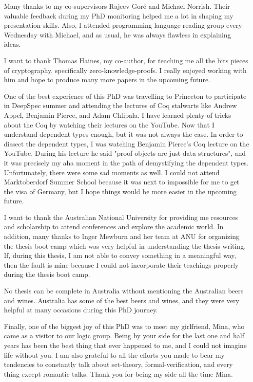 Many thanks to my co-supervisors Rajeev Gor\'e and Michael Norrish. Their valuable feedback during my PhD monitoring 
helped me a lot in shaping my presentation skills. Also, I attended programming language reading 
group every Wednesday with  Michael, and as usual, he was always flawless in explaining ideas. 
 
 I want to thank Thomas Haines, my co-author,  for teaching me all the bits pieces of cryptography, specifically zero-knowledge-proofs.  
 I really enjoyed working with him and hope to produce many more papers in the upcoming future. 
 
 
 One of the best experience of this PhD was travelling to Princeton to participate in DeepSpec summer and attending 
 the lectures of Coq stalwarts  like Andrew Appel, Benjamin Pierce, and Adam Chlipala. I have learned 
 plenty of tricks about the Coq by watching their lectures on the YouTube. Now that I understand 
 dependent types enough, but it was not always the case. In order to dissect the dependent types, 
 I was watching Benjamin Pierce's Coq lecture on the YouTube. During his lecture he said  "proof objects are 
 just data structures", and it was precisely my aha moment in the path of demystifying the dependent types. 
 Unfortunately, there were some sad moments as well. I could not attend Marktoberdorf Summer School because 
 it was next to impossible for me to get the visa of Germany, but I hope
 things would be more easier in the upcoming future. 
 
 I want to thank the Australian National University for providing me resources and scholarship to attend 
 conferences and explore the academic world. In addition, many thanks to 
 Inger Mewburn  and her team at ANU for organizing the thesis boot camp which was very helpful 
 in understanding the thesis writing. If, during this thesis, I am not able to convey something in 
 a meaningful way, then the fault is mine because I could not incorporate their teachings properly 
 during the thesis boot camp. 
  
 No thesis can be complete in Australia without mentioning the Australian beers and wines. 
 Australia has some of the best beers and wines, and they were very helpful at many occasions
 during this PhD journey. 
 
 Finally, one of the biggest joy of this PhD was to meet my girlfriend, Mina, who came as a visitor 
 to our logic group. Being by your side for the last one and half years has been the best thing that ever happened to me, and I could not 
 imagine life without you.   I am also grateful to all the efforts you made to bear my tendencies to constantly
  talk about set-theory, formal-verification, and every thing except romantic talks. Thank you for being my side 
  all the time Mina. 
  
